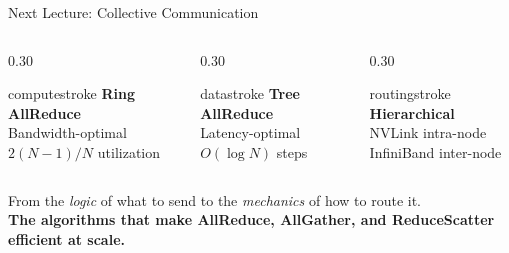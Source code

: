 \documentclass[aspectratio=169, 12pt]{beamer}
\begin{document}
\begin{frame}{Next Lecture: Collective Communication}

\footnotesize
\begin{columns}[c]
  \begin{column}{0.30\textwidth}
    \centering
    \begin{mlsyscard}{computestroke}
    {\large\bfseries Ring AllReduce}\\[0.1cm]
    {\scriptsize Bandwidth-optimal\\$2(N\!-\!1)/N$ utilization}
    \end{mlsyscard}
  \end{column}
  \begin{column}{0.30\textwidth}
    \centering
    \begin{mlsyscard}{datastroke}
    {\large\bfseries Tree AllReduce}\\[0.1cm]
    {\scriptsize Latency-optimal\\$O(\log N)$ steps}
    \end{mlsyscard}
  \end{column}
  \begin{column}{0.30\textwidth}
    \centering
    \begin{mlsyscard}{routingstroke}
    {\large\bfseries Hierarchical}\\[0.1cm]
    {\scriptsize NVLink intra-node\\InfiniBand inter-node}
    \end{mlsyscard}
  \end{column}
\end{columns}

\vspace{0.2cm}
\centering
{\normalsize From the \emph{logic} of what to send to the \emph{mechanics} of how to route it.}\\[0.1cm]
{\small\textbf{The algorithms that make AllReduce, AllGather, and ReduceScatter efficient at scale.}}

\end{frame}
\end{document}
